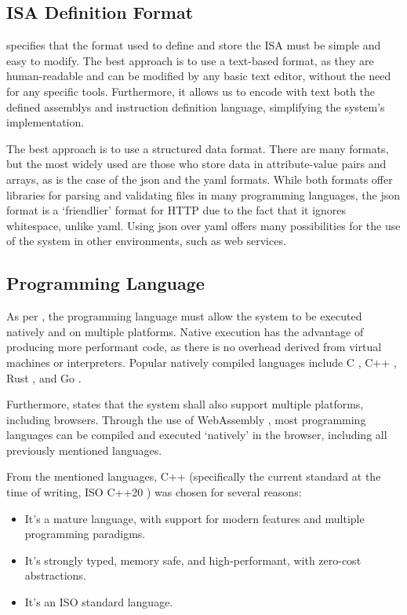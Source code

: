 \subsection{ISA Definition Format}\label{subsec:isa-format-study}
 specifies that the format used to define and store the \gls{ISA} must be simple and easy to modify. The best approach is to use a text-based format, as they are human-readable and can be modified by any basic text editor, without the need for any specific tools. Furthermore, it allows us to encode with text  both the defined \glspl{assembly} and \gls{instruction} definition language, simplifying the system's implementation.

The best approach is to use a structured data format. There are many formats, but the most widely used are those who store data in attribute-value pairs and arrays, as is the case of the \gls{json} \parencite{ISO21778} and the \gls{yaml} \parencite{yamlspec} formats. While both formats offer libraries for parsing and validating files in many programming languages, the \gls{json} format is a `friendlier' format for \gls{HTTP} due to the fact that it ignores whitespace, unlike \gls{yaml}. Using \gls{json} over \gls{yaml} offers many possibilities for the use of the system in other environments, such as \glspl{web service}.


\subsection{Programming Language}\label{subsec:language-study}
As per , the \gls{programming language} must allow the system to be executed natively and on multiple platforms. Native execution has the advantage of producing more performant code, as there is no overhead derived from virtual machines or \glspl{interpreter}. Popular natively compiled languages include C \parencite{KernighanBrianW1988TCpl}, C++ \parencite{StroustrupBjarne2013TCpl}, Rust \parencite{KlabnikSteve2023TRpl}, and Go \parencite{DonovanAlan2015TGPL} \parencite{statista2023langstats}.

Furthermore,  states that the system shall also support multiple platforms, including browsers. Through the use of WebAssembly \parencite{HaasAndreas2017Btwu}, most programming languages can be compiled and executed `natively' in the browser, including all previously mentioned languages.

From the mentioned languages, C++ (specifically the current standard at the time of writing, ISO C++20 \parencite{ISOcpp20}) was chosen for several reasons:
\begin{itemize}[nosep]
  \item It's a mature language, with support for modern features and multiple \glspl{programming paradigm}.
  \item It's strongly typed, memory safe, and high-performant, with zero-cost abstractions.  %
  \item It's an ISO standard language.
\end{itemize}



